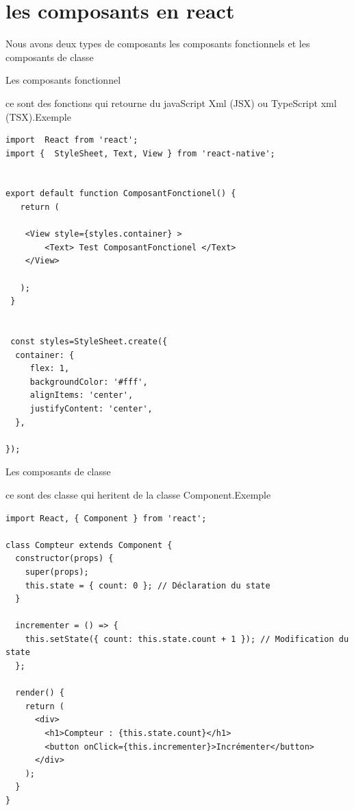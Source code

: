 \documentclass[5pt]{beamer}
\begin{document}
{\section{les composants en react}

\begin{frame}[fragile]{}
\begin{block}{}

Nous avons deux types de composants les composants fonctionnels
et les composants de classe

\end{block}
\end{frame}

\begin{frame}[fragile]{Les composants fonctionnel}
\begin{block}{}

ce sont des fonctions qui retourne du javaScript Xml (JSX) ou TypeScript xml (TSX).Exemple
\begin{verbatim}
import  React from 'react';
import {  StyleSheet, Text, View } from 'react-native';


export default function ComposantFonctionel() {
   return (

    <View style={styles.container} >
      	<Text> Test ComposantFonctionel </Text>
    </View>
    
   );
 }


 const styles=StyleSheet.create({
  container: {
     flex: 1,
     backgroundColor: '#fff',
     alignItems: 'center',
     justifyContent: 'center',
  },
  
});
\end{verbatim}
\end{block}
\end{frame}


\begin{frame}[fragile]{Les composants de classe}
\begin{block}{}

ce sont des classe qui heritent de la classe Component.Exemple
\begin{verbatim}
import React, { Component } from 'react';

class Compteur extends Component {
  constructor(props) {
    super(props);
    this.state = { count: 0 }; // Déclaration du state
  }

  incrementer = () => {
    this.setState({ count: this.state.count + 1 }); // Modification du state
  };

  render() {
    return (
      <div>
        <h1>Compteur : {this.state.count}</h1>
        <button onClick={this.incrementer}>Incrémenter</button>
      </div>
    );
  }
}


\end{verbatim}
\end{block}
\end{frame}}
\end{document}

